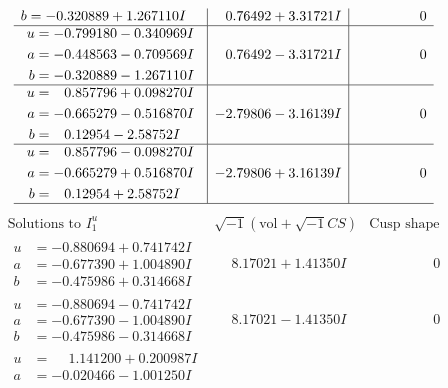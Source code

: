 \documentclass[1p]{elsarticle_modified}
\theoremstyle{definition}
\newcommand{\I}{\sqrt{-1}}
\begin{document}
$$\begin{array}{c|c|c}
\begin{aligned}
b &= -0.320889 + 1.267110 I\end{aligned}
 & \phantom{-}0.76492 + 3.31721 I & \phantom{-0.000000 } 0 \\ \hline\begin{aligned}
u &= -0.799180 - 0.340969 I \\
a &= -0.448563 - 0.709569 I \\
b &= -0.320889 - 1.267110 I\end{aligned}
 & \phantom{-}0.76492 - 3.31721 I & \phantom{-0.000000 } 0 \\ \hline\begin{aligned}
u &= \phantom{-}0.857796 + 0.098270 I \\
a &= -0.665279 - 0.516870 I \\
b &= \phantom{-}0.12954 - 2.58752 I\end{aligned}
 & -2.79806 - 3.16139 I & \phantom{-0.000000 } 0 \\ \hline\begin{aligned}
u &= \phantom{-}0.857796 - 0.098270 I \\
a &= -0.665279 + 0.516870 I \\
b &= \phantom{-}0.12954 + 2.58752 I\end{aligned}
 & -2.79806 + 3.16139 I & \phantom{-0.000000 } 0\\
 \hline 
 \end{array}$$\newpage$$\begin{array}{c|c|c}  
\text{Solutions to }I^u_{1}& \I (\text{vol} + \sqrt{-1}CS) & \text{Cusp shape}\\
 \hline 
\begin{aligned}
u &= -0.880694 + 0.741742 I \\
a &= -0.677390 + 1.004890 I \\
b &= -0.475986 + 0.314668 I\end{aligned}
 & \phantom{-}8.17021 + 1.41350 I & \phantom{-0.000000 } 0 \\ \hline\begin{aligned}
u &= -0.880694 - 0.741742 I \\
a &= -0.677390 - 1.004890 I \\
b &= -0.475986 - 0.314668 I\end{aligned}
 & \phantom{-}8.17021 - 1.41350 I & \phantom{-0.000000 } 0 \\ \hline\begin{aligned}
u &= \phantom{-}1.141200 + 0.200987 I \\
a &= -0.020466 - 1.001250 I \\

\end{aligned}
\end{array}$$
\end{document}
